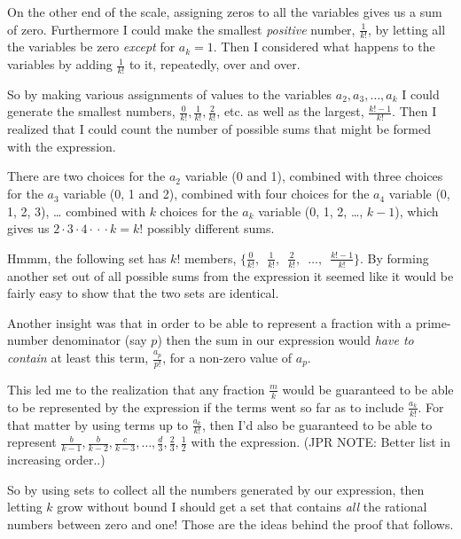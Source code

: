 \documentclass{article}
\begin{document}
On the other end of the scale, assigning zeros to all the variables 
gives us a sum of zero.
Furthermore
I could make
the smallest \emph{positive} number, \(\frac{1}{k!}\), by
letting all the variables be zero \emph{except} for \(a_k = 1\).
Then I considered what happens to the variables by
adding \(\frac{1}{k!}\) to it, repeatedly, over and over.

So by making various assignments of values to
the variables \(a_2, a_3, \dots{}, a_k\) I could
generate the smallest numbers, \(\frac{0}{k!}, \frac{1}{k!}, \frac{2}{k!}\), etc.
as well as the largest,
\(\frac{k!-1}{k!}\).
Then I realized that I could count the number of possible sums that might be formed 
with the expression.

There are two choices for the \(a_2\) variable (0 and 1),
combined with three choices for the \(a_3\) variable (0, 1 and 2),
combined with four choices for the \(a_4\) variable (0, 1, 2, 3),
\dots{} combined with \(k\) choices for
the \(a_k\) variable (0, 1, 2, \dots{}, \(k\!-\!1\)), which
gives us \(2\cdot{}3\cdot{}4\cdot{}\cdot{}\cdot{}k = k!\) possibly different sums.

Hmmm, the following set has \(k!\) members,
\(\{\frac{0}{k!},\enspace \frac{1}{k!},\enspace \frac{2}{k!},
\enspace \dots{},\enspace \frac{k!-1}{k!}\}\).
By forming another set out of all possible sums from the expression
it seemed like it would be fairly easy to show that the two sets are identical.

Another insight was that in order to be able to represent
a fraction with a prime-number denominator (say \(p\))
then the sum in our
expression would \emph{have to contain} at least this term,
\(\frac{a_p}{p!}\),
for a non-zero value of \(a_p\).

This led me to the realization that any fraction \(\frac{m}{k}\)
would be guaranteed to be able to be represented by the expression
if the terms went so far as to include \(\frac{a_k}{k!}\). For that
matter by using terms up to \(\frac{a_k}{k!}\), then I'd
also be guaranteed to be able to represent \(\frac{b}{k-1},
\frac{b}{k-2},
\frac{c}{k-3}, \dots{},
\frac{d}{3},
\frac{2}{3},
\frac{1}{2}\) with the expression.
(JPR NOTE: Better list in increasing order..)

So by using sets to collect all the numbers generated
by our expression, then letting \(k\) grow without bound
I should get a set that contains \emph{all} the rational numbers between zero and one!
Those are the ideas behind the proof that follows.

\break
\end{document}
